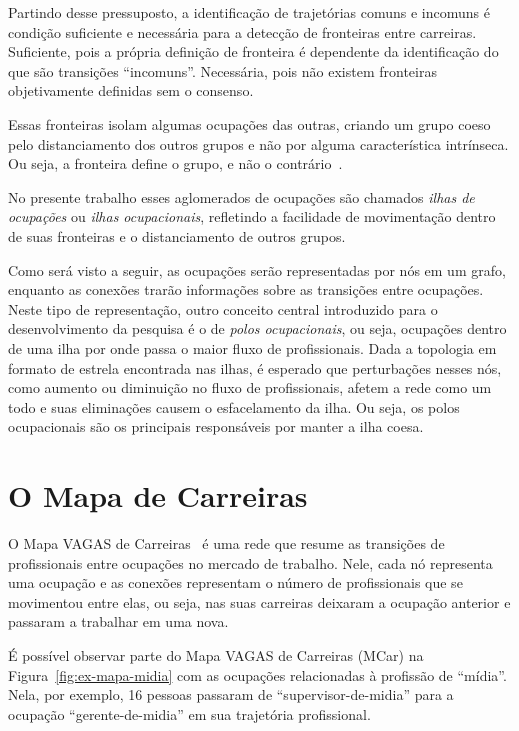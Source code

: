 \documentclass[
  article,
  11pt,
  a4paper,
  english,
  brazil,
  sumario=tradicional]{abntex2}
\begin{document}
Partindo desse pressuposto, a identificação de trajetórias comuns e incomuns é condição suficiente e necessária para a detecção de fronteiras entre carreiras. Suficiente, pois a própria definição de fronteira é dependente da identificação do que são transições \enquote{incomuns}. Necessária, pois não existem fronteiras objetivamente definidas sem o consenso.

Essas fronteiras isolam algumas ocupações das outras, criando um grupo coeso pelo distanciamento dos outros grupos e não por alguma característica intrínseca.  Ou seja, a fronteira define o grupo, e não o contrário~\cite{Gunz2007-hr,Abbott1995-ft}. 

No presente trabalho esses aglomerados de ocupações são chamados \textit{ilhas de ocupações} ou \textit{ilhas ocupacionais}, refletindo a facilidade de movimentação dentro de suas fronteiras e o distanciamento de outros grupos.

Como será visto a seguir, as ocupações serão representadas por nós em um grafo, enquanto as conexões trarão informações sobre as transições entre ocupações. Neste tipo de representação, outro conceito central introduzido para o desenvolvimento da pesquisa é o de \textit{polos ocupacionais}, ou seja, ocupações dentro de uma ilha por onde passa o maior fluxo de profissionais. Dada a topologia em formato de estrela encontrada nas ilhas, é esperado que perturbações nesses nós, como aumento ou diminuição no fluxo de profissionais, afetem a rede como um todo e suas eliminações causem o esfacelamento da ilha. Ou seja, os polos ocupacionais são os principais responsáveis por manter a ilha coesa. 

\section{O Mapa de Carreiras} \label{sec:mapa}

O Mapa VAGAS de Carreiras~\cite{VAGAS_Tecnologia2014-yv} é uma rede que resume as transições de profissionais entre ocupações no mercado de trabalho. Nele, cada nó representa uma ocupação e as conexões representam o número de profissionais que se movimentou entre elas, ou seja, nas suas carreiras deixaram a ocupação anterior e passaram a trabalhar em uma nova.

É possível observar parte do Mapa VAGAS de Carreiras (MCar) na Figura~\ref{fig:ex-mapa-midia} com as ocupações relacionadas à profissão de \enquote{mídia}. Nela, por exemplo, 16 pessoas passaram de \enquote{supervisor-de-midia} para a ocupação \enquote{gerente-de-midia} em sua trajetória profissional.
\end{document}
